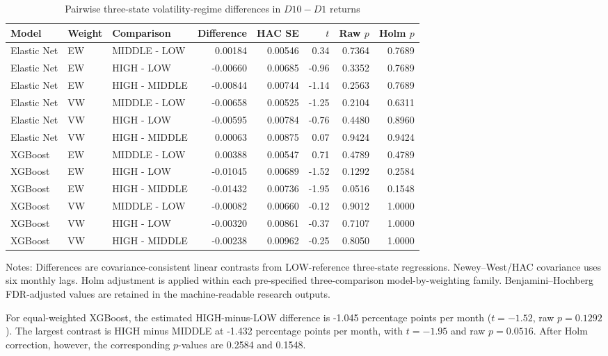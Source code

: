 \begin{table}[htbp]
\centering
\caption{Pairwise three-state volatility-regime differences in $D10-D1$ returns}
\label{tab:three-state-long-short-differences}
\small
\begin{tabular}{lllrrrrr}
\hline
Model & Weight & Comparison & Difference & HAC SE & $t$ & Raw $p$ & Holm $p$ \\
\hline
Elastic Net & EW & MIDDLE - LOW  &  0.00184 & 0.00546 &  0.34 & 0.7364 & 0.7689 \\
Elastic Net & EW & HIGH - LOW    & -0.00660 & 0.00685 & -0.96 & 0.3352 & 0.7689 \\
Elastic Net & EW & HIGH - MIDDLE & -0.00844 & 0.00744 & -1.14 & 0.2563 & 0.7689 \\
Elastic Net & VW & MIDDLE - LOW  & -0.00658 & 0.00525 & -1.25 & 0.2104 & 0.6311 \\
Elastic Net & VW & HIGH - LOW    & -0.00595 & 0.00784 & -0.76 & 0.4480 & 0.8960 \\
Elastic Net & VW & HIGH - MIDDLE &  0.00063 & 0.00875 &  0.07 & 0.9424 & 0.9424 \\
XGBoost     & EW & MIDDLE - LOW  &  0.00388 & 0.00547 &  0.71 & 0.4789 & 0.4789 \\
XGBoost     & EW & HIGH - LOW    & -0.01045 & 0.00689 & -1.52 & 0.1292 & 0.2584 \\
XGBoost     & EW & HIGH - MIDDLE & -0.01432 & 0.00736 & -1.95 & 0.0516 & 0.1548 \\
XGBoost     & VW & MIDDLE - LOW  & -0.00082 & 0.00660 & -0.12 & 0.9012 & 1.0000 \\
XGBoost     & VW & HIGH - LOW    & -0.00320 & 0.00861 & -0.37 & 0.7107 & 1.0000 \\
XGBoost     & VW & HIGH - MIDDLE & -0.00238 & 0.00962 & -0.25 & 0.8050 & 1.0000 \\
\hline
\end{tabular}
\begin{flushleft}
\small
Notes: Differences are covariance-consistent linear contrasts from LOW-reference three-state regressions. Newey--West/HAC covariance uses six monthly lags. Holm adjustment is applied within each pre-specified three-comparison model-by-weighting family. Benjamini--Hochberg FDR-adjusted values are retained in the machine-readable research outputs.
\end{flushleft}
\end{table}

For equal-weighted XGBoost, the estimated HIGH-minus-LOW difference is -1.045 percentage points per month ($t=-1.52$, raw $p=0.1292$). The largest contrast is HIGH minus MIDDLE at -1.432 percentage points per month, with $t=-1.95$ and raw $p=0.0516$. After Holm correction, however, the corresponding $p$-values are 0.2584 and 0.1548.


